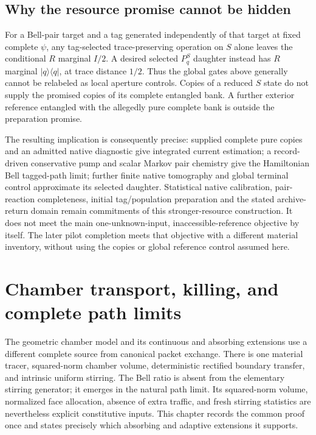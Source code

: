 \documentclass[11pt,oneside,openany]{book}
\theoremstyle{definition}
\theoremstyle{remark}\newtheorem{remark}[theorem]{Remark}
\begin{document}
\section{Why the resource promise cannot be hidden}

For a Bell-pair target and a tag generated independently of that target
at fixed complete $\psi$, any tag-selected trace-preserving operation
on $S$ alone leaves the conditional $R$ marginal $I/2$. A desired
selected $P_q^S$ daughter instead has $R$ marginal
$|q\rangle\langle q|$, at trace distance $1/2$. Thus the global
gates above generally cannot be relabeled as local aperture controls.
Copies of a reduced $S$ state do not supply the promised copies of its
complete entangled bank. A further exterior reference entangled with
the allegedly pure complete bank is outside the preparation promise.

The resulting implication is consequently precise: supplied complete
pure copies and an admitted native diagnostic give integrated current
estimation; a record-driven conservative pump and scalar Markov pair
chemistry give the Hamiltonian Bell tagged-path limit; further finite
native tomography and global terminal control approximate its selected
daughter. Statistical native calibration, pair-reaction completeness,
initial tag/population preparation and the stated archive-return domain
remain commitments of this stronger-resource construction. It does not
meet the main one-unknown-input, inaccessible-reference objective by
itself. The later pilot completion meets that objective with a different
material inventory, without using the copies or global reference control
assumed here.



\chapter{Chamber transport, killing, and complete path limits}
\label{chamber:chapter}

The geometric chamber model \cite{M24} and its continuous and absorbing extensions \cite{M26,M27} use a different complete source from canonical packet exchange. There is one material tracer, squared-norm chamber volume, deterministic rectified boundary transfer, and intrinsic uniform stirring. The Bell ratio is absent from the elementary stirring generator; it emerges in the natural path limit. Its squared-norm volume, normalized face allocation, absence of extra traffic, and fresh stirring statistics are nevertheless explicit constitutive inputs. This chapter records the common proof once and states precisely which absorbing and adaptive extensions it supports.
\end{document}
